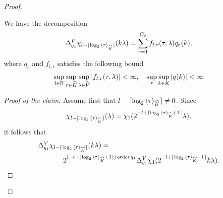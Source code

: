 \begin{proof}
\begin{description}
            \begin{claim}
                We have the decomposition
                \begin{align*}
                    \DifferenceOperator[\VectorSpace]{q_1} \chi_{l - \Ceiling{\log_2 \JapaneseBracket{\CompactGroup}{\tau}}}(k \lambda) = \sum_{r = 1}^{C_q} f_{l, r}(\tau, \lambda) q_r(k),
                \end{align*}
                where $q_r$ and $f_{l, r}$ satisfies the following bound
                \begin{align}
                    \sup_{l \in \N} \sup_{\tau \in \dualGroup{\CompactGroup}} \sup_{\lambda \in \dualGroup{\VectorSpace}} \abs{f_{l, r}(\tau, \lambda)} < \infty,\quad
                    \sup_{r} \sup_{k \in \CompactGroup} \abs{q(k)} < \infty
                    \label{eq:theorem:Littlewood-Paley_decomposition:claim_bound}
                \end{align}
            \end{claim}
            \begin{proof}[Proof of the claim]
                Assume first that $l - \Ceiling{\log_2 \JapaneseBracket{\CompactGroup}{\tau}} \neq 0$.
                Since
                \begin{align*}
                    \chi_{l - \Ceiling{\log_2 \JapaneseBracket{\CompactGroup}{\tau}}}(\lambda)
                    = \chi_1(2^{-l + \Ceiling{\log_2 \JapaneseBracket{\CompactGroup}{\tau} + 1}} \lambda),
                \end{align*}
                it follows that
                \begin{align*}
                    \DifferenceOperator[\VectorSpace]{q_1} &\chi_{l - \Ceiling{\log_2 \JapaneseBracket{\CompactGroup}{\tau}}}(k \lambda)
                    =\\
                    &\qquad 2^{(-l + \Ceiling{\log_2 \JapaneseBracket{\CompactGroup}{\tau} + 1}) \order{q_1}}
                    \DifferenceOperator[\VectorSpace]{q_1} \chi_1(2^{-l + \Ceiling{\log_2 \JapaneseBracket{\CompactGroup}{\tau} + 1}} k \lambda).
                \end{align*}


\end{proof}
\end{description}
\end{proof}
